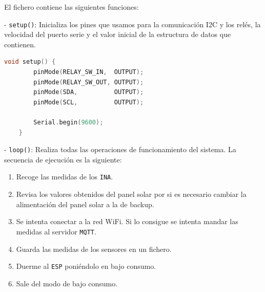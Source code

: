 El fichero contiene las siguientes funciones:

- \texttt{setup()}: Inicializa los pines que usamos para la comunicación I2C y los relés, la velocidad del puerto serie y el valor inicial de la estructura de datos que contienen.

\begin{lstlisting}[captionpos=b, caption={Codigo de la funcion setup}, language=c++]
    void setup() {
        pinMode(RELAY_SW_IN,  OUTPUT);
        pinMode(RELAY_SW_OUT, OUTPUT);
        pinMode(SDA,          OUTPUT);
        pinMode(SCL,          OUTPUT);
    
        Serial.begin(9600);
    }    
\end{lstlisting}

- \texttt{loop()}: Realiza todas las operaciones de funcionamiento del sistema. La secuencia de ejecución es la siguiente:
\begin{enumerate}
    \item Recoge las medidas de los \texttt{INA}.
    \item Revisa los valores obtenidos del panel solar por si es necesario cambiar la alimentación del panel solar a la de backup.
    \item Se intenta conectar a la red WiFi. Si lo consigue se intenta mandar las medidas al servidor \texttt{MQTT}.
    \item Guarda las medidas de los sensores en un fichero.
    \item Duerme al \texttt{ESP} poniéndolo en bajo consumo.
    \item Sale del modo de bajo consumo.
\end{enumerate}

